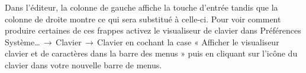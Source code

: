 \documentclass[11pt,french]{article}
\newcommand{\mnu}[1]{\textsf{#1}}
\newcommand{\To}{\,\(\to\)\,}
\begin{document}
Dans l'éditeur, la colonne de gauche affiche la touche d'entrée tandis que la colonne de droite montre ce qui sera substitué à celle-ci. Pour voir comment produire certaines de ces frappes activez le visualiseur de clavier dans \mnu{Préférences Système…}\To\mnu{Clavier}\To\mnu{Clavier} en cochant la case « \mnu{Afficher le visualiseur clavier et de caractères dans la barre des menus} » puis en cliquant sur l'icône du clavier dans votre nouvelle barre de menus.


\begin{figure}
\begin{floatrow}
%
\end{floatrow}
\end{figure}
\end{document}
